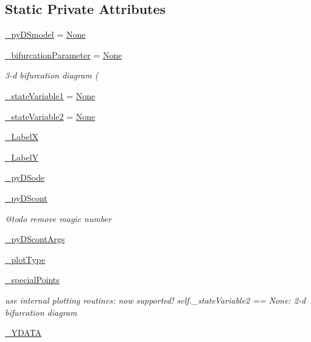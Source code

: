 \subsection*{Static Private Attributes}
\begin{DoxyCompactItemize}
\item 
\hyperlink{class_mu_mo_t_1_1_mu_mo_tbifurcation_view_a9e9a430da6d323cc4411c070e0c7eee5}{\+\_\+py\+D\+Smodel} = \hyperlink{class_mu_mo_t_1_1_mu_mo_tbifurcation_view_ac7485dcc8d256a6f197ed7802687f252}{None}
\item 
\hyperlink{class_mu_mo_t_1_1_mu_mo_tbifurcation_view_a17d5bd0e623faea6f50fc3b7f01d0d38}{\+\_\+bifurcation\+Parameter} = \hyperlink{class_mu_mo_t_1_1_mu_mo_tbifurcation_view_ac7485dcc8d256a6f197ed7802687f252}{None}
\begin{DoxyCompactList}\small\item\em 3-\/d bifurcation diagram ( \end{DoxyCompactList}\item 
\hyperlink{class_mu_mo_t_1_1_mu_mo_tbifurcation_view_aa14fa36730691becc6f3136899545416}{\+\_\+state\+Variable1} = \hyperlink{class_mu_mo_t_1_1_mu_mo_tbifurcation_view_ac7485dcc8d256a6f197ed7802687f252}{None}
\item 
\hyperlink{class_mu_mo_t_1_1_mu_mo_tbifurcation_view_a9d3705d1d9182e10751ff693573d6d16}{\+\_\+state\+Variable2} = \hyperlink{class_mu_mo_t_1_1_mu_mo_tbifurcation_view_ac7485dcc8d256a6f197ed7802687f252}{None}
\item 
\hyperlink{class_mu_mo_t_1_1_mu_mo_tbifurcation_view_a1ae22852e6ebc2a6b1cdfee3383063e9}{\+\_\+\+LabelX}
\item 
\hyperlink{class_mu_mo_t_1_1_mu_mo_tbifurcation_view_ae2c6b16828eec194022056d04af84f16}{\+\_\+\+LabelY}
\item 
\hyperlink{class_mu_mo_t_1_1_mu_mo_tbifurcation_view_a45f0a60363e440604d8e5b08930eb7b5}{\+\_\+py\+D\+Sode}
\item 
\hyperlink{class_mu_mo_t_1_1_mu_mo_tbifurcation_view_a797e92fe19ce2636a49bf1400a69fc49}{\+\_\+py\+D\+Scont}
\begin{DoxyCompactList}\small\item\em @todo remove magic number \end{DoxyCompactList}\item 
\hyperlink{class_mu_mo_t_1_1_mu_mo_tbifurcation_view_aa56e2cffc879be68fdec55f29334415c}{\+\_\+py\+D\+Scont\+Args}
\item 
\hyperlink{class_mu_mo_t_1_1_mu_mo_tbifurcation_view_a5feff4ca83ee97d6e09874496a4975d4}{\+\_\+plot\+Type}
\item 
\hyperlink{class_mu_mo_t_1_1_mu_mo_tbifurcation_view_a0b40fc612e7c7203adf3274967cdd2ab}{\+\_\+special\+Points}
\begin{DoxyCompactList}\small\item\em use internal plotting routines\+: now supported! self.\+\_\+state\+Variable2 == None\+: 2-\/d bifurcation diagram \end{DoxyCompactList}\item 
\hyperlink{class_mu_mo_t_1_1_mu_mo_tbifurcation_view_a225ffda570ae3d9d5675af2fe28c1cbe}{\+\_\+\+Y\+D\+A\+TA}
\end{DoxyCompactItemize}


